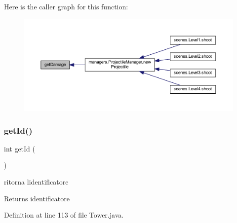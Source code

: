 Here is the caller graph for this function\+:
\nopagebreak
\begin{figure}[H]
\begin{center}
\leavevmode
\includegraphics[width=350pt]{classtowers_1_1_tower_ac10b854131d21646691dcdd7da559a22_icgraph}
\end{center}
\end{figure}
\mbox{\label{classtowers_1_1_tower_a67283be3f45257d1e0c474c563ebb6b6}} 
\subsubsection{\texorpdfstring{get\+Id()}{getId()}}
{\footnotesize\ttfamily int get\+Id (\begin{DoxyParamCaption}{ }\end{DoxyParamCaption})}



ritorna l\textquotesingle{}identificatore 

\begin{DoxyReturn}{Returns}
identificatore 
\end{DoxyReturn}


Definition at line 113 of file Tower.\+java.

